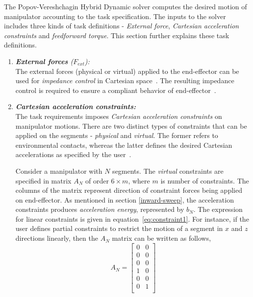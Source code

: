 The Popov-Vereshchagin Hybrid Dynamic solver computes the desired motion of manipulator accounting to the task specification. The inputs to the solver includes three kinds of task definitions - \textit{External force}, \textit{Cartesian acceleration constraints} and \textit{feedforward torque}. This section further explains these task definitions.

\begin{enumerate}
	\item \textit{\textbf{External forces} ($F_{ext}$):} \\
	The external forces (physical or virtual) applied to the end-effector can be used for \textit{impedance control} in Cartesian space~\cite{siciliano2016springer}. The resulting impedance control is required to ensure a compliant behavior of end-effector~\cite{albu2002cartesian}. 
	
	\item \textit{\textbf{Cartesian acceleration constraints:}} \\
	The task requirements imposes \textit{Cartesian acceleration constraints} on manipulator motions. There are two distinct types of constraints that can be applied on the segments - \textit{physical} and \textit{virtual}. The former refers to environmental contacts, whereas the latter defines the desired Cartesian accelerations as specified by the user~\cite{shakhimardanov2015composable}. 
	
	Consider a manipulator with $N$ segments. The \textit{virtual} constraints are specified in matrix $A_N$ of order $6 \times m$, where $m$ is number of constraints. The columns of the matrix represent direction of constraint forces being applied on end-effector. As mentioned in section \ref{inward-sweep}, the acceleration constraints produces \textit{acceleration energy}, represented by $b_N$. The expression for linear constraints is given in equation~\ref{eq:constraint1}. For instance, if the user defines partial constraints to restrict the motion of a segment in $x$ and $z$ directions linearly, then the $A_N$ matrix can be written as follows,
	\begin{equation}\label{eq:A}
	A_N = 	\begin{bmatrix}
	0 & 0 \\
	0 & 0 \\
	0 & 0 \\
	1 & 0 \\
	0 & 0 \\
	0 & 1 \\
	\end{bmatrix} 	
	\end{equation}
	

\end{enumerate}

